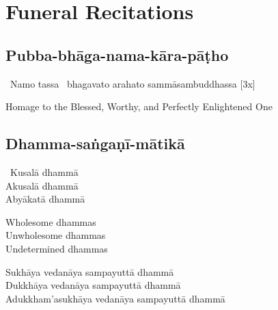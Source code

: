 
\ifdesktopversion
\else
\fi

\chapter{Funeral Recitations}

\clearpage



\section{Pubba-bhāga-nama-kāra-pāṭho}
\label{pubba-bhaga-nama-kara-patho-funeral}


\begin{pali-hangtogether}
  \anglebracketleft\ \hspace{-0.5mm}Namo tassa \hspace{-0.5mm}\anglebracketright\ bhagavato arahato sammāsambuddhassa \hfill{[3x]}
\end{pali-hangtogether}

\begin{english}
  Homage to the Blessed, Worthy, and Perfectly Enlightened One
\end{english}

\suttaRef{[DN 21]}



\section{Dhamma-saṅgaṇī-mātikā}
\label{dhamma-sangani-matika}

\begin{pali-hangtogether}
  \anglebracketleft\ \hspace{-0.5mm}Kusalā dhammā \hspace{-0.5mm}\anglebracketright\ \\
  Akusalā dhammā\\
  Abyākatā dhammā
\end{pali-hangtogether}

\begin{english-verses}
  Wholesome dhammas\\
  Unwholesome dhammas\\
  Undetermined dhammas
\end{english-verses}

\begin{pali-hang-continued}
  Sukhāya vedanāya sampayuttā dhammā\\
  Dukkhāya vedanāya sampayuttā dhammā\\
  Adukkham'asukhāya vedanāya sampayuttā dhammā
\end{pali-hang-continued}

